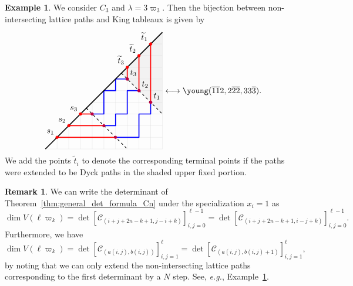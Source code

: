 \documentclass[11pt, leqno]{amsart}
\theoremstyle{plain}
\theoremstyle{definition}
\newtheorem{example}[theorem]{Example}
\newtheorem{remark}[theorem]{Remark}
\numberwithin{equation}{section}
\newcommand{\fw}{\varpi} %
\newcommand{\Cat}{\mathcal{C}} %
\newcommand{\othree}{\overline{3}}
\newcommand{\otwo}{\overline{2}}
\newcommand{\one}{\overline{1}}
\newcommand{\dyckgrid}[1]{
\foreach \i in {0, ..., #1} {\draw[gray!40, very thin] (\i,\i) -- (#1, \i); \draw[gray!40, very thin] (\i,\i) -- (\i, 0);}
}
\begin{document}
\begin{example}
\label{ex:JT_full_rect}
We consider $C_3$ and $\lambda = 3\fw_3$.
Then the bijection between non-intersecting lattice paths and King tableaux is given by
\[
\begin{tikzpicture}[scale=0.5, baseline=68]
\fill[gray!10] (6.5,6.5) -- (10,3) -- (10,10) -- cycle;
\dyckgrid{10}
\draw[very thick, blue, line join=round] (4,3) -- (5,3) -- (5, 5) -- (6,5) -- (6,6) -- (7,6);
\draw[very thick, blue, line join=round] (5,2) -- (6,2) -- (6,3) -- (7,3) -- (7,5) -- (8,5);
\draw[very thick, blue, line join=round] (6,1) -- (8,1) -- (8,3) -- (9,3) -- (9,4);
\draw[very thick,-] (0,0) -- (10,10);
\foreach \i in {1,2,3}
{
  \draw[very thick, red] (\i, \i) -- +(7-2*\i, 0);
  \draw[very thick, red] (10-\i, 10-\i) -- +(0, -7+2*\i);
}
\draw[thick,dashed] (3.5,3.5) -- +(3.5, -3.5);
\draw[thick,dashed] (6.5,6.5) -- +(3.5, -3.5);
\foreach \i in {1,2,3}
{
  \draw[fill=red, color=red] (\i, \i) circle (0.12);
  \draw (\i, \i) node[anchor=south east] {$s_{\i}$};
  \draw[fill=red, color=red] (10-\i, 10-\i) circle (0.12);
  \draw (10-\i, 10-\i) node[anchor=south east] {$\widetilde{t}_{\i}$};
}
\foreach \i in {1,2,3}
{
  \draw[fill=purple, color=purple] (3+\i, 4-\i) circle (0.12);
  \draw[fill=purple, color=purple] (6+\i, 7-\i) circle (0.12);
}
\foreach \i in {1,2,3}
{
  \draw[fill=purple, color=purple] (6+\i, 7-\i) circle (0.12);
  \draw (10-\i, 3+\i) node[anchor=south west] {$t_{\i}$};
}
\end{tikzpicture}
\longleftrightarrow
\young(\one\one2,2\otwo\otwo,33\othree).
\]
We add the points $\widetilde{t}_i$ to denote the corresponding terminal points if the paths were extended to be Dyck paths in the shaded upper fixed portion.
\end{example}

\begin{remark}
\label{rem:other_forms}
We can write the determinant of Theorem~\ref{thm:general_det_formula_Cn} under the specialization $x_i = 1$ as
\[
\dim V(\ell \fw_k) = \det \left[ \Cat_{(i+j+2n-k+1,j-i+k)} \right]_{i,j=0}^{\ell-1} =\det \left[ \Cat_{(i+j+2n-k+1,i-j+k)} \right]_{i,j=0}^{\ell-1}.
\]
Furthermore, we have
\begin{equation}
\label{eq:extending_det}
\dim V(\ell \fw_k) = \det \left[ \Cat_{(a(i,j), b(i,j))} \right]_{i,j=1}^{\ell} = \det \left[ \Cat_{(a(i,j), b(i,j)+1)} \right]_{i,j=1}^{\ell},
\end{equation}
by noting that we can only extend the non-intersecting lattice paths corresponding to the first determinant by a $N$ step. See, \textit{e.g.}, Example~\ref{ex:JT_full_rect}.
\end{remark}
\end{document}
